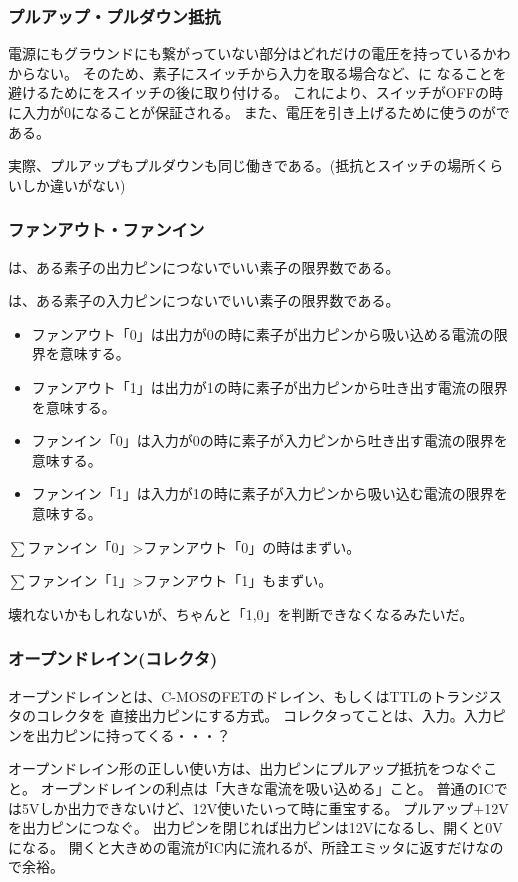 \documentclass[12pt]{ltjsarticle}
\begin{document}
\subsubsection{プルアップ・プルダウン抵抗}
電源にもグラウンドにも繋がっていない部分はどれだけの電圧を持っているかわからない。
そのため、素子にスイッチから入力を取る場合など、に
なることを避けるためにをスイッチの後に取り付ける。
これにより、スイッチがOFFの時に入力が0になることが保証される。
また、電圧を引き上げるために使うのがである。

実際、プルアップもプルダウンも同じ働きである。(抵抗とスイッチの場所くらいしか違いがない)

\subsubsection{ファンアウト・ファンイン}
は、ある素子の出力ピンにつないでいい素子の限界数である。

は、ある素子の入力ピンにつないでいい素子の限界数である。
\begin{itemize}
\item ファンアウト「0」は出力が0の時に素子が出力ピンから吸い込める電流の限界を意味する。
\item ファンアウト「1」は出力が1の時に素子が出力ピンから吐き出す電流の限界を意味する。
\item ファンイン「0」は入力が0の時に素子が入力ピンから吐き出す電流の限界を意味する。
\item ファンイン「1」は入力が1の時に素子が入力ピンから吸い込む電流の限界を意味する。
\end{itemize}
$\sum$ファンイン「0」>ファンアウト「0」の時はまずい。

$\sum$ファンイン「1」>ファンアウト「1」もまずい。

壊れないかもしれないが、ちゃんと「1,0」を判断できなくなるみたいだ。

\subsubsection{オープンドレイン(コレクタ)}
オープンドレインとは、C-MOSのFETのドレイン、もしくはTTLのトランジスタのコレクタを
直接出力ピンにする方式。
コレクタってことは、入力。入力ピンを出力ピンに持ってくる・・・？

オープンドレイン形の正しい使い方は、出力ピンにプルアップ抵抗をつなぐこと。
オープンドレインの利点は「大きな電流を吸い込める」こと。
普通のICでは5Vしか出力できないけど、12V使いたいって時に重宝する。
プルアップ+12Vを出力ピンにつなぐ。
出力ピンを閉じれば出力ピンは12Vになるし、開くと0Vになる。
開くと大きめの電流がIC内に流れるが、所詮エミッタに返すだけなので余裕。
\end{document}
